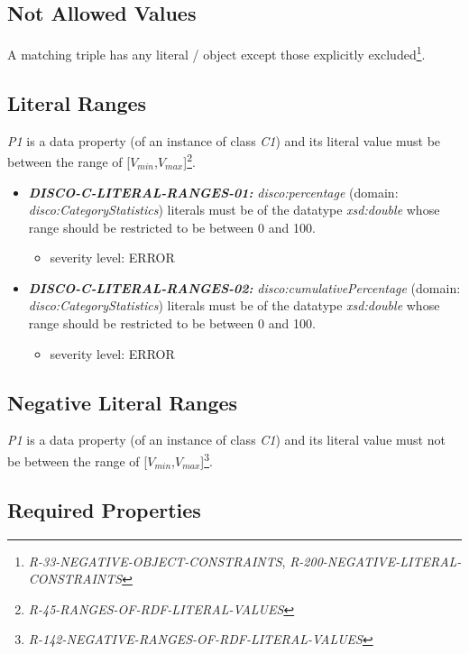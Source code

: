 \documentclass{llncs}
\begin{document}
\subsection{Not Allowed Values}

A matching triple has any literal / object except those explicitly excluded\footnote{\emph{R-33-NEGATIVE-OBJECT-CONSTRAINTS}, \emph{R-200-NEGATIVE-LITERAL-CONSTRAINTS}}.

\subsection{Literal Ranges}

\emph{P1} is a data property (of an instance of class \emph{C1}) and its literal value must be between the range of [$V_{min}$,$V_{max}$]\footnote{{\em R-45-RANGES-OF-RDF-LITERAL-VALUES}}.

\begin{itemize}
	\item \textbf{{\em DISCO-C-LITERAL-RANGES-01:}}
{\em disco:percentage} (domain: {\em disco:CategoryStatistics}) literals must be of the datatype {\em xsd:double} whose range should be restricted to be between 0 and 100.
	\begin{itemize}
		\item severity level: ERROR
	\end{itemize}
	
	\item \textbf{{\em DISCO-C-LITERAL-RANGES-02:}}
{\em disco:cumulativePercentage} (domain: {\em disco:CategoryStatistics}) literals must be of the datatype {\em xsd:double} whose range should be restricted to be between 0 and 100.
	\begin{itemize}
		\item severity level: ERROR
	\end{itemize}
	
	
\end{itemize}

\subsection{Negative Literal Ranges}

\emph{P1} is a data property (of an instance of class \emph{C1}) and its literal value must not be between the range of [$V_{min}$,$V_{max}$]\footnote{{\em R-142-NEGATIVE-RANGES-OF-RDF-LITERAL-VALUES}}.

\subsection{Required Properties}
\end{document}

